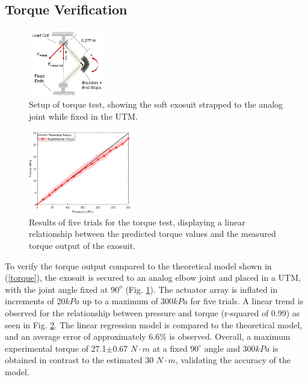 \documentclass[letterpaper, 10 pt, conference]{ieeeconf}  %
\begin{document}
\subsection{Torque Verification}


\begin{figure} [t!]
\centering
\includegraphics[width=0.3\textwidth]{torquetest.PNG}
\caption{Setup of torque test, showing the soft exosuit strapped to the analog joint while fixed in the UTM. }
\label{fig:t_test}
\end{figure}

\begin{figure}
\centering
\includegraphics[width=0.4\textwidth]{Torque_stuff3.PNG}
\caption{Results of five trials for the torque test, displaying a linear relationship between the predicted torque values and the measured torque output of the exosuit.}
\label{fig:torques}
\vspace{-1em}
\end{figure}

To verify the torque output compared to the theoretical model shown in (\ref{torque}), the exosuit is secured to an analog elbow joint and placed in a UTM, with the joint angle fixed at $90^o$ (Fig. \ref{fig:t_test}). The actuator array is inflated in increments of 20$kPa$ up to a maximum of 300$kPa$ for five trials.  A linear trend is observed for the relationship between pressure and torque (r-squared of 0.99) as seen in Fig. \ref{fig:torques}. The linear regression model is compared to the theoretical model, and an average error of approximately 6.6\% is observed.  Overall, a maximum experimental torque of  27.1$\pm$0.67 $N\cdot m$ at a fixed  $90^{\circ}$ angle and 300$kPa$ is obtained in contrast to the estimated 30 $N{\cdot}m$, validating the accuracy of the model.
\end{document}
